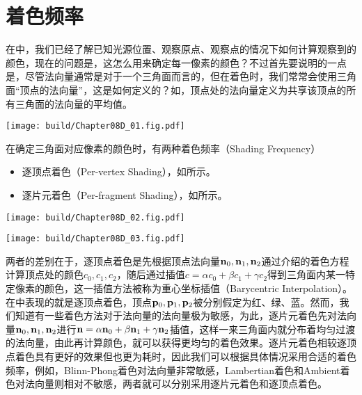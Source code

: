 \section{着色频率}



在中，我们已经了解已知光源位置、观察原点、观察点的情况下如何计算观察到的颜色，现在的问题是，这怎么用来确定每一像素的颜色？不过首先要说明的一点是，尽管法向量通常是对于一个三角面而言的，但在着色时，我们常常会使用三角面“顶点的法向量”，这是如何定义的？如，顶点处的法向量定义为共享该顶点的所有三角面的法向量的平均值。

\begin{Figure}[顶点处的法向量]
    \texttt{[image: build/Chapter08D\_01.fig.pdf]}
\end{Figure}

在确定三角面对应像素的颜色时，有两种着色频率（Shading Frequency）
\begin{itemize}
    \item 逐顶点着色（Per-vertex Shading），如所示。
    \item 逐片元着色（Per-fragment Shading），如所示。
\end{itemize}
\begin{Figure}[着色频率]
    \begin{FigureSub}[逐顶点着色]
        \texttt{[image: build/Chapter08D\_02.fig.pdf]}
    \end{FigureSub}
    \hspace{0.5cm}
    \begin{FigureSub}[逐片元着色]
        \texttt{[image: build/Chapter08D\_03.fig.pdf]}
    \end{FigureSub}
\end{Figure}
两者的差别在于，逐顶点着色是先根据顶点法向量$\vb{n}_0,\vb{n}_1,\vb{n}_2$通过介绍的着色方程计算顶点处的颜色$c_0,c_1,c_2$，随后通过插值$c=\alpha c_0+\beta c_1+\gamma c_2$得到三角面内某一特定像素的颜色，这一插值方法被称为重心坐标插值（Barycentric Interpolation）。在中表现的就是逐顶点着色，顶点$\vb{p}_0,\vb{p}_1,\vb{p}_2$被分别假定为红、绿、蓝。然而，我们知道有一些着色方法对于法向量的法向量极为敏感，为此，逐片元着色先对法向量$\vb{n}_0,\vb{n}_1,\vb{n}_2$进行$\vb{n}=\alpha\vb{n}_0+\beta\vb{n}_1+\gamma\vb{n}_2$插值，这样一来三角面内就分布着均匀过渡的法向量，由此再计算颜色，就可以获得更均匀的着色效果。逐片元着色相较逐顶点着色具有更好的效果但也更为耗时，因此我们可以根据具体情况采用合适的着色频率，例如，Blinn-Phong着色对法向量非常敏感，Lambertian着色和Ambient着色对法向量则相对不敏感，两者就可以分别采用逐片元着色和逐顶点着色。

